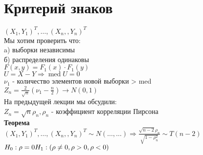 \documentclass{article}
\newcommand\0{\mathbb{0}}
\DeclareMathOperator{\med}{med}
\newcommand\1{\mathbb{1}}
\newcommand{\Rto}{\Rightarrow}
\begin{document}
\section{Критерий знаков}
$(X_1, Y_1)^T, \dots, (X_n, , Y_n)^T$\\
Мы хотим проверить что:\\
a) выборки независимы\\
б) распределения одинаковы\\
$F(x, y) = F_1(x) \cdot F_1(y)$\\
$U = X - Y \Rto \med U = 0$\\
$\nu_1$ - количество элементов новой выборки > med\\
$Z_n = \frac{2}{\sqrt{n}}(\nu_1 - \frac{n}{2}) \to N(0, 1)$\\
На предыдущей лекции мы обсудили:\\
$Z_n = \sqrt{n} \rho_n, \rho_n$ - коэффициент корреляции Пирсона\\
\textbf{Теорема}\\
$(X_1, Y_1)^T, \dots, (X_n, , Y_n)^T \sim N(\dots, \dots) \Rto \frac{\sqrt{n -2} \rho_n}{\sqrt{1 - \rho_n^2}} \sim T(n - 2)$\\
$H_0: \rho = 0\\
H_1: (\rho \neq 0, \rho > 0, \rho < 0)$
\end{document}
